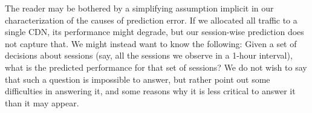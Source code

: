 \begin{figure}[t!]
\centering
{}
\label{fig:compare-to-naive}
\end{figure}


The reader may be bothered by a simplifying assumption implicit in our characterization of the causes of prediction error.  If we allocated all traffic to a single CDN, its performance might degrade, but our session-wise prediction does not capture that.  We might instead want to know the following: Given a set of decisions about sessions (say, all the sessions we observe in a 1-hour interval), what is the predicted performance for that set of sessions?  We do not wish to say that such a question is impossible to answer, but rather point out some difficulties in answering it, and some reasons why it is less critical to answer it than it may appear.

